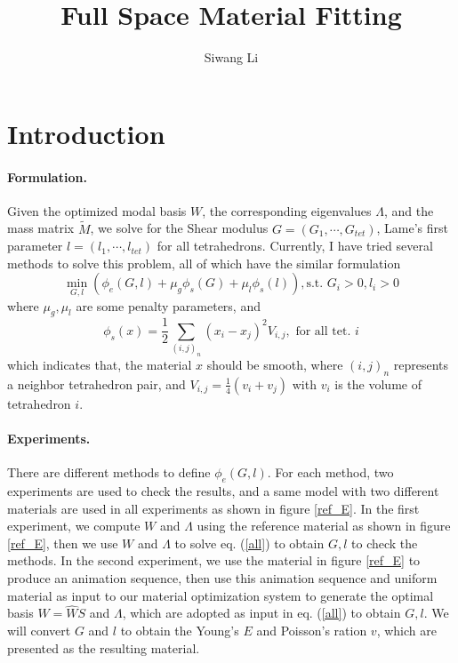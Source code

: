 \documentclass[9pt,twocolumn]{extarticle}
\author{Siwang Li}
\title{Full Space Material Fitting}
\begin{document}
\maketitle

\setlength{\parskip}{0.5ex}

\section{Introduction}
\paragraph{Formulation.} Given the optimized modal basis $W$, the corresponding eigenvalues
$\Lambda$, and the mass matrix $\tilde{M}$, we solve for the Shear modulus
$G=(G_1,\cdots,G_{tet})$, Lame's first parameter $l=(l_1,\cdots,l_{tet})$ for
all tetrahedrons. Currently, I have tried several methods to solve this problem,
all of which have the similar formulation
\begin{equation} \label{all}
  \min_{G,l}(\phi_e(G,l)+\mu_{g}\phi_s(G)+\mu_{l}\phi_s(l)), \mbox{s.t. } G_i>0, l_i>0
\end{equation}
where $\mu_g, \mu_l$ are some penalty parameters, and
\begin{equation} \label{smooth}
  \phi_s(x) = \frac{1}{2}\sum_{(i,j)_{n}}(x_i-x_j)^2V_{i,j}, \mbox{ for all
    tet. }i
\end{equation}
which indicates that, the material $x$ should be smooth, where $(i,j)_{n}$ represents a
neighbor tetrahedron pair, and $V_{i,j}=\frac{1}{4}(v_i+v_j)$ with $v_i$ is the
volume of tetrahedron $i$. 

\paragraph{Experiments.} There are different methods to define
$\phi_e(G,l)$. For each method, two experiments are used to check the results,
and a same model with two different materials are used in all experiments as
shown in figure \ref{ref_E}. In the first experiment, we compute $W$ and
$\Lambda$ using the reference material as shown in figure \ref{ref_E}, then we
use $W$ and $\Lambda$ to solve eq. (\ref{all}) to obtain $G,l$ to check the
methods. In the second experiment, we use the material in figure \ref{ref_E} to
produce an animation sequence, then use this animation sequence and uniform
material as input to our material optimization system to generate the optimal
basis $W=\hat{W}S$ and $\Lambda$, which are adopted as input in eq. (\ref{all})
to obtain $G,l$. We will convert $G$ and $l$ to obtain the Young's $E$ and
Poisson's ration $v$, which are presented as the resulting material.
\end{document}
